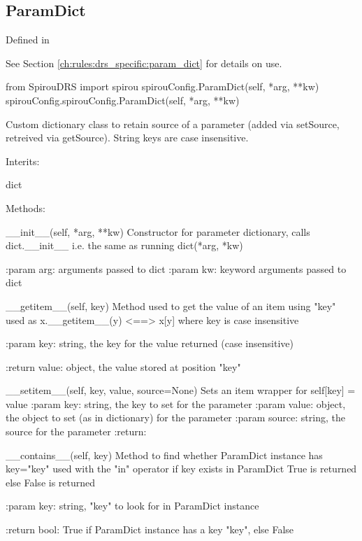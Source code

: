 \begin{minipage}{\textwidth}
\subsection{ParamDict}
\label{ch:the_module:spirouConfig:ParamDict}

Defined in \spirouConfig{}

See Section \ref{ch:rules:drs_specific:param_dict} for details on use.

\begin{pythonbox}
from SpirouDRS import spirou
spirouConfig.ParamDict(self, *arg, **kw)
spirouConfig.spirouConfig.ParamDict(self, *arg, **kw)
\end{pythonbox}

\begin{pythondocstring}
Custom dictionary class to retain source of a parameter (added via setSource,
retreived via getSource). String keys are case insensitive.

Interits:

	dict

Methods:

	__init__(self, *arg, **kw)
	        Constructor for parameter dictionary, calls dict.__init__
	        i.e. the same as running dict(*arg, *kw)

	        :param arg: arguments passed to dict
	        :param kw: keyword arguments passed to dict

	__getitem__(self, key)
	        Method used to get the value of an item using "key"
	        used as x.__getitem__(y) <==> x[y]
	        where key is case insensitive

	        :param key: string, the key for the value returned (case insensitive)

	        :return value: object, the value stored at position "key"

 	__setitem__(self, key, value, source=None)
	        Sets an item wrapper for self[key] = value
	        :param key: string, the key to set for the parameter
	        :param value: object, the object to set (as in dictionary) for the
	                      parameter
	        :param source: string, the source for the parameter
	        :return:

	__contains__(self, key)
	        Method to find whether ParamDict instance has key="key"
	        used with the "in" operator
	        if key exists in ParamDict True is returned else False is returned

	        :param key: string, "key" to look for in ParamDict instance

	        :return bool: True if ParamDict instance has a key "key", else False

\end{pythondocstring}
\end{minipage}

